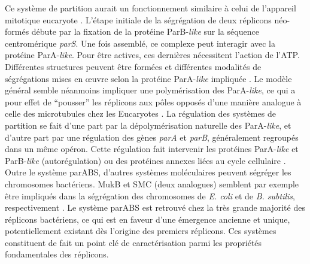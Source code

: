 	Ce système de partition aurait un fonctionnement similaire à celui de l'appareil mitotique eucaryote \citep{Mierzejewska2012}. L'étape initiale de la ségrégation de deux réplicons néo-formés débute par la fixation de la protéine ParB-\textit{like} sur la séquence centromérique \textit{parS}. Une fois assemblé, ce complexe peut interagir avec la protéine ParA-\textit{like}. Pour être actives, ces dernières nécessitent l'action de l'ATP. Différentes structures peuvent être formées et différentes modalités de ségrégations mises en œuvre selon la protéine ParA-\textit{like} impliquée \citep{Mierzejewska2012,funnell2004partition}. Le modèle général semble néanmoins impliquer une polymérisation des ParA-\textit{like}, ce qui a pour effet de “pousser” les réplicons aux pôles opposés d'une manière analogue à celle des microtubules  chez les Eucaryotes \citep{Mierzejewska2012}. La régulation des systèmes de partition se fait d'une part par la dépolymérisation naturelle des ParA-\textit{like}, et d'autre part par une régulation des gènes \textit{parA} et \textit{parB}, généralement regroupés dans un même opéron. Cette régulation fait intervenir les protéines ParA-\textit{like} et ParB-\textit{like} (autorégulation) ou des protéines annexes liées au cycle cellulaire \citep{Mierzejewska2012,funnell2004partition,Pinto2012}. Outre le système parABS, d'autres systèmes moléculaires peuvent ségréger les chromosomes bactériens. MukB et SMC (deux analogues) semblent par exemple être impliqués dans la ségrégation des chromosomes de \textit{E. coli} et de \textit{B. subtilis}, respectivement \citep{Toro2010}. Le système parABS est retrouvé chez la très grande majorité des réplicons bactériens, ce qui est en faveur d'une émergence ancienne et unique, potentiellement existant dès l'origine des premiers réplicons. Ces systèmes constituent de fait un point clé de caractérisation parmi les propriétés fondamentales des réplicons.



